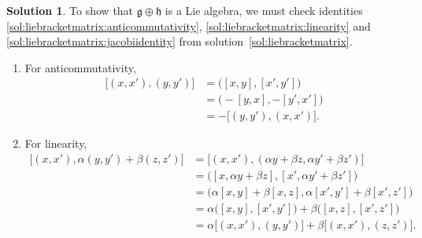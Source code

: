 \documentclass[11pt, a4paper]{report}
\theoremstyle{definition}
\newtheorem{solution}{Solution}[part]
\newenvironment{sol}{\begin{solution}}{\end{solution}\pagebreak[3]}
\begin{document}
\begin{sol}

To show that $\mathfrak{g} \oplus \mathfrak{h}$ is a Lie algebra, we must check identities
\ref{sol:liebracketmatrix:anticommutativity}, %
\ref{sol:liebracketmatrix:linearity} and      %
\ref{sol:liebracketmatrix:jacobiidentity}     %
from solution~\ref{sol:liebracketmatrix}.

\begin{enumerate}

    \item For anticommutativity,
    \begin{align*}
        \bigl[(x, x'), (y, y') \bigr] &= \bigl( [x, y], [x'\!, y'] \bigr) \\
                                      &= \bigl( -[y, x], -[y'\!, x'] \bigr) \\
                                      &= -\bigl[(y, y'), (x, x') \bigr].
    \end{align*}

    \item For linearity,
    \begin{align*}
        \bigl[(x, x'), \alpha (y, y') + \beta (z, z') \bigr]
            &= \bigl[ (x, x'), (\alpha y + \beta z, \alpha y' + \beta z') \bigr] \\
            &= \bigl( [x, \alpha y + \beta z], [x', \alpha y' + \beta z'] \bigr) \\
            &= \bigl( \alpha [x, y] + \beta [x, z],
                      \alpha [x', y'] + \beta [x', z'] \bigr) \\
            &= \alpha \bigl( [x, y], [x', y'] \bigr)
               + \beta \bigl( [x, z], [x', z'] \bigr) \\
            &= \alpha \bigl[ (x, x'), (y, y') \bigr]
               + \beta \bigl[ (x, x'), (z, z') \bigr].
    \end{align*}


\end{enumerate}
\end{sol}
\end{document}
